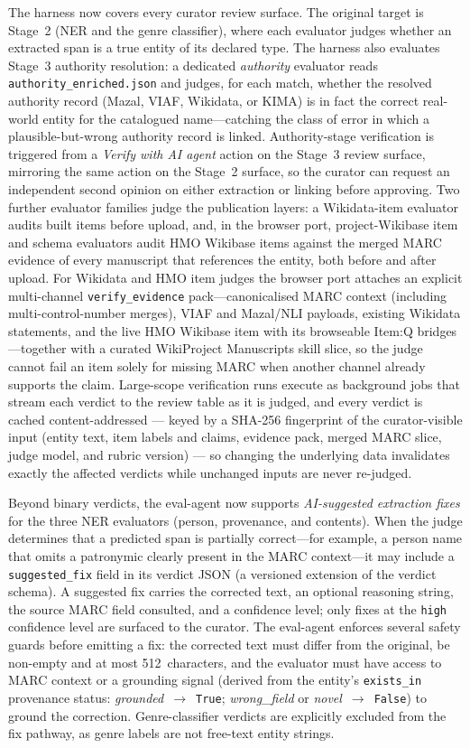 \documentclass[Afour,sageh,times]{sagej}
\begin{document}
The harness now covers every curator review surface. The original target is Stage~2 (NER and the genre classifier), where each evaluator judges whether an extracted span is a true entity of its declared type. The harness also evaluates Stage~3 authority resolution: a dedicated \emph{authority} evaluator reads \texttt{authority\_enriched.json} and judges, for each match, whether the resolved authority record (Mazal, VIAF, Wikidata, or KIMA) is in fact the correct real-world entity for the catalogued name---catching the class of error in which a plausible-but-wrong authority record is linked. Authority-stage verification is triggered from a \emph{Verify with AI agent} action on the Stage~3 review surface, mirroring the same action on the Stage~2 surface, so the curator can request an independent second opinion on either extraction or linking before approving. Two further evaluator families judge the publication layers: a Wikidata-item evaluator audits built items before upload, and, in the browser port, project-Wikibase item and schema evaluators audit HMO Wikibase items against the merged MARC evidence of every manuscript that references the entity, both before and after upload. For Wikidata and HMO item judges the browser port attaches an explicit multi-channel \texttt{verify\_evidence} pack---canonicalised MARC context (including multi-control-number merges), VIAF and Mazal/NLI payloads, existing Wikidata statements, and the live HMO Wikibase item with its browseable Item:Q bridges---together with a curated WikiProject Manuscripts skill slice, so the judge cannot fail an item solely for missing MARC when another channel already supports the claim. Large-scope verification runs execute as background jobs that stream each verdict to the review table as it is judged, and every verdict is cached content-addressed --- keyed by a SHA-256 fingerprint of the curator-visible input (entity text, item labels and claims, evidence pack, merged MARC slice, judge model, and rubric version) --- so changing the underlying data invalidates exactly the affected verdicts while unchanged inputs are never re-judged.

Beyond binary verdicts, the eval-agent now supports \emph{AI-suggested extraction fixes} for the three NER evaluators (person, provenance, and contents). When the judge determines that a predicted span is partially correct---for example, a person name that omits a patronymic clearly present in the MARC context---it may include a \texttt{suggested\_fix} field in its verdict JSON (a versioned extension of the verdict schema). A suggested fix carries the corrected text, an optional reasoning string, the source MARC field consulted, and a confidence level; only fixes at the \texttt{high} confidence level are surfaced to the curator. The eval-agent enforces several safety guards before emitting a fix: the corrected text must differ from the original, be non-empty and at most 512~characters, and the evaluator must have access to MARC context or a grounding signal (derived from the entity's \texttt{exists\_in} provenance status: \emph{grounded}~$\to$~\texttt{True}; \emph{wrong\_field} or \emph{novel}~$\to$~\texttt{False}) to ground the correction. Genre-classifier verdicts are explicitly excluded from the fix pathway, as genre labels are not free-text entity strings.
\end{document}
